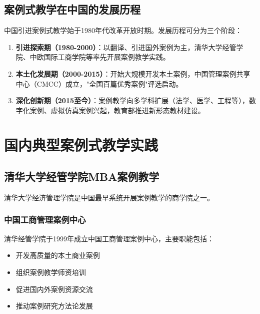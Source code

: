 \documentclass[12pt,a4paper]{ctexart}
\begin{document}
\subsection{案例式教学在中国的发展历程}

中国引进案例式教学始于1980年代改革开放时期。发展历程可分为三个阶段：

\begin{enumerate}[leftmargin=2em]
    \item \textbf{引进探索期（1980-2000）}：以翻译、引进国外案例为主，清华大学经管学院、中欧国际工商学院等率先开展案例教学实践。

    \item \textbf{本土化发展期（2000-2015）}：开始大规模开发本土案例，中国管理案例共享中心（CMCC）成立，"全国百篇优秀案例"评选启动。

    \item \textbf{深化创新期（2015至今）}：案例教学向多学科扩展（法学、医学、工程等），数字化案例、虚拟仿真案例兴起，教育部推进新形态教材建设。
\end{enumerate}

\section{国内典型案例式教学实践}

\subsection{清华大学经管学院MBA案例教学}

清华大学经济管理学院是中国最早系统开展案例教学的商学院之一。

\subsubsection{中国工商管理案例中心}

清华经管学院于1999年成立中国工商管理案例中心，主要职能包括：
\begin{itemize}[leftmargin=2em]
    \item 开发高质量的本土商业案例
    \item 组织案例教学师资培训
    \item 促进国内外案例资源交流
    \item 推动案例研究方法论发展
\end{itemize}
\end{document}
